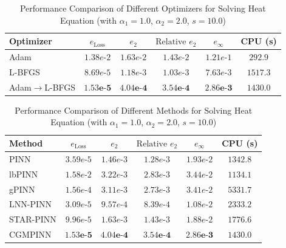 \documentclass{article}
\theoremstyle{plain}
\theoremstyle{definition}
\theoremstyle{remark}
\begin{document}
\begin{table}[t]
	\centering
	\caption{Performance Comparison of Different Optimizers for Solving Heat Equation (with $\alpha_1 = 1.0$, $\alpha_2 = 2.0$, $s = 10.0$)}
	\label{tab:heat_equation_optimizer_performance}
	\begin{tabular}{lccccc}
		\toprule
		Optimizer & $e_{\text{Loss}}$ & $e_2$ & $\text{Relative } e_2$ & $e_\infty$ & CPU (s) \\
		\midrule
		Adam               & $1.38e\text{-}2$ & $1.63e\text{-}2$ & $1.43e\text{-}2$ & $1.21e\text{-}1$ & $292.9$   \\
		L-BFGS             & $8.69e\text{-}5$ & $1.18e\text{-}3$ & $1.03e\text{-}3$ & $7.63e\text{-}3$ & $1517.3$  \\
		Adam$\to$L-BFGS    & $\mathbf{1.53e\text{-}5}$ & $\mathbf{4.04e\text{-}4}$ & $\mathbf{3.54e\text{-}4}$ & $\mathbf{2.86e\text{-}3}$ & $1430.0$    \\
		\bottomrule
	\end{tabular}
\end{table}

\begin{table}[t]
	\centering
	\caption{Performance Comparison of Different Methods for Solving Heat Equation (with $\alpha_1 = 1.0$, $\alpha_2 = 2.0$, $s = 10.0$)}
	\label{tab:heat_equation_pinn_methods_performance}
	\begin{tabular}{lccccc}
		\toprule
		Method & $e_{\text{Loss}}$ & $e_2$ & $\text{Relative } e_2$ & $e_\infty$ & CPU (s) \\
		\midrule
		PINN               & $3.59e\text{-}5$ & $1.46e\text{-}3$ & $1.28e\text{-}3$ & $1.93e\text{-}2$ & $1342.8$   \\
		lbPINN             & $1.58e\text{-}2$ & $3.22e\text{-}3$ & $2.83e\text{-}3$ & $3.44e\text{-}2$ & $1134.1$   \\
		gPINN              & $1.56e\text{-}4$ & $3.11e\text{-}3$ & $2.73e\text{-}3$ & $3.41e\text{-}2$ & $5331.7$   \\
		LNN-PINN           & $3.09e\text{-}5$ & $9.57e\text{-}4$ & $8.39e\text{-}4$ & $1.08e\text{-}2$ & $2333.2$   \\
		STAR-PINN          & $9.96e\text{-}5$ & $1.63e\text{-}3$ & $1.43e\text{-}3$ & $1.88e\text{-}2$ & $1776.6$   \\
		CGMPINN            & $\mathbf{1.53e\text{-}5}$ & $\mathbf{4.04e\text{-}4}$ & $\mathbf{3.54e\text{-}4}$ & $\mathbf{2.86e\text{-}3}$ & $1430.0$   \\
		\bottomrule
	\end{tabular}
\end{table}
\end{document}
